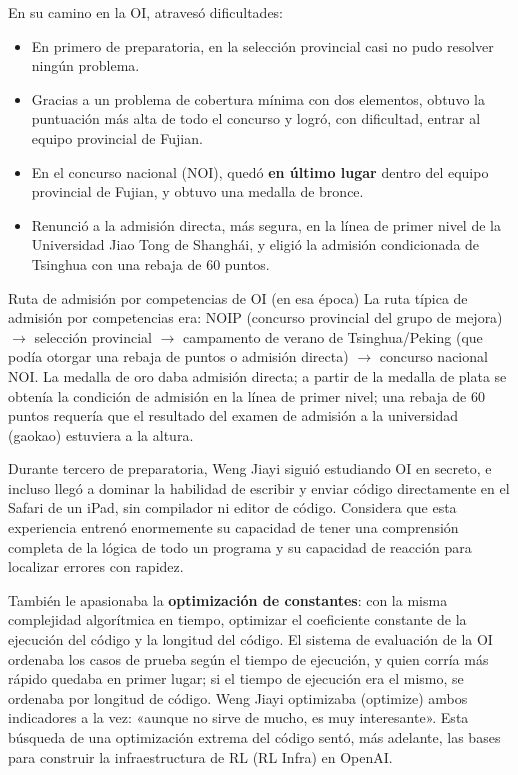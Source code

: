 \documentclass[a4paper]{article}
\begin{document}
En su camino en la OI, atravesó dificultades:
\begin{itemize}
    \item En primero de preparatoria, en la selección provincial casi no pudo resolver ningún problema.
    \item Gracias a un problema de cobertura mínima con dos elementos, obtuvo la puntuación más alta de todo el concurso y logró, con dificultad, entrar al equipo provincial de Fujian.
    \item En el concurso nacional (NOI), quedó \textbf{en último lugar} dentro del equipo provincial de Fujian, y obtuvo una medalla de bronce.
    \item Renunció a la admisión directa, más segura, en la línea de primer nivel de la Universidad Jiao Tong de Shanghái, y eligió la admisión condicionada de Tsinghua con una rebaja de 60 puntos.
\end{itemize}

\begin{knowledgebox}{Ruta de admisión por competencias de OI (en esa época)}
La ruta típica de admisión por competencias era: NOIP (concurso provincial del grupo de mejora) $\rightarrow$ selección provincial $\rightarrow$ campamento de verano de Tsinghua/Peking (que podía otorgar una rebaja de puntos o admisión directa) $\rightarrow$ concurso nacional NOI. La medalla de oro daba admisión directa; a partir de la medalla de plata se obtenía la condición de admisión en la línea de primer nivel; una rebaja de 60 puntos requería que el resultado del examen de admisión a la universidad (gaokao) estuviera a la altura.
\end{knowledgebox}

Durante tercero de preparatoria, Weng Jiayi siguió estudiando OI en secreto, e incluso llegó a dominar la habilidad de escribir y enviar código directamente en el Safari de un iPad, sin compilador ni editor de código. Considera que esta experiencia entrenó enormemente su capacidad de tener una comprensión completa de la lógica de todo un programa y su capacidad de reacción para localizar errores con rapidez.

También le apasionaba la \textbf{optimización de constantes}: con la misma complejidad algorítmica en tiempo, optimizar el coeficiente constante de la ejecución del código y la longitud del código. El sistema de evaluación de la OI ordenaba los casos de prueba según el tiempo de ejecución, y quien corría más rápido quedaba en primer lugar; si el tiempo de ejecución era el mismo, se ordenaba por longitud de código. Weng Jiayi optimizaba (optimize) ambos indicadores a la vez: «aunque no sirve de mucho, es muy interesante». Esta búsqueda de una optimización extrema del código sentó, más adelante, las bases para construir la infraestructura de RL (RL Infra) en OpenAI.
\end{document}
